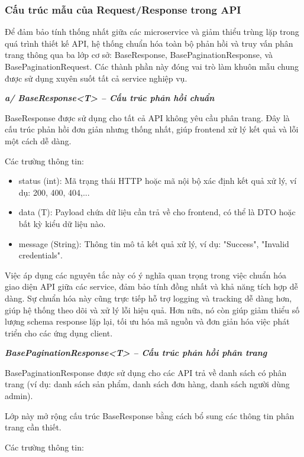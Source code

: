 \subsubsection{Cấu trúc mẫu của Request/Response trong API}

Để đảm bảo tính thống nhất giữa các microservice và giảm thiểu trùng lặp trong quá trình thiết kế API, hệ thống chuẩn hóa toàn bộ phản hồi và truy vấn phân trang thông qua ba lớp cơ sở: BaseResponse, BasePaginationResponse, và BasePaginationRequest. Các thành phần này đóng vai trò làm khuôn mẫu chung được sử dụng xuyên suốt tất cả service nghiệp vụ.

\textbf{\textit{a/ BaseResponse<T> – Cấu trúc phản hồi chuẩn }}

BaseResponse được sử dụng cho tất cả API không yêu cầu phân trang. Đây là cấu trúc phản hồi đơn giản nhưng thống nhất, giúp frontend xử lý kết quả và lỗi một cách dễ dàng.

Các trường thông tin:

\begin{itemize}
    \item status (int): Mã trạng thái HTTP hoặc mã nội bộ xác định kết quả xử lý, ví dụ: 200, 400, 404,...
    \item data (T): Payload chứa dữ liệu cần trả về cho frontend, có thể là DTO hoặc bất kỳ kiểu dữ liệu nào.
    \item message (String): Thông tin mô tả kết quả xử lý, ví dụ: "Success", "Invalid credentials".
\end{itemize}

Việc áp dụng các nguyên tắc này có ý nghĩa quan trọng trong việc chuẩn hóa giao diện API giữa các service, đảm bảo tính đồng nhất và khả năng tích hợp dễ dàng. Sự chuẩn hóa này cũng trực tiếp hỗ trợ logging và tracking dễ dàng hơn, giúp hệ thống theo dõi và xử lý lỗi hiệu quả. Hơn nữa, nó còn giúp giảm thiểu số lượng schema response lặp lại, tối ưu hóa mã nguồn và đơn giản hóa việc phát triển cho các ứng dụng client.

\textbf{\textit{BasePaginationResponse<T> – Cấu trúc phản hồi phân trang}}

BasePaginationResponse được sử dụng cho các API trả về danh sách có phân trang (ví dụ: danh sách sản phẩm, danh sách đơn hàng, danh sách người dùng admin).

Lớp này mở rộng cấu trúc BaseResponse bằng cách bổ sung các thông tin phân trang cần thiết.

Các trường thông tin:

